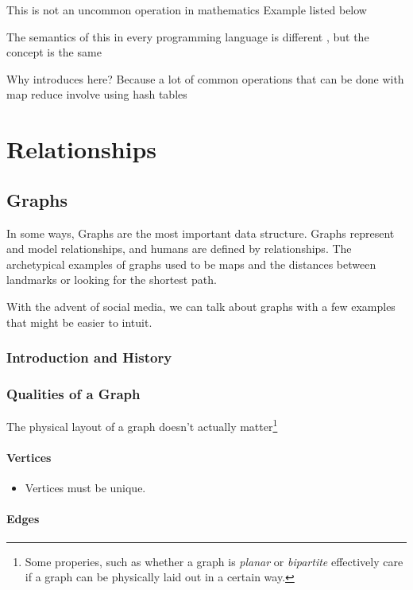 \documentclass[10pt,a4paper]{book}
\begin{document}
This is not an uncommon operation in mathematics Example listed below 



The semantics of this in every programming language is different , but the concept is the same 



Why introduces here? Because a lot of common operations that can be done with map reduce involve using hash tables 


\part{Relationships}

\chapter{Graphs}

In some ways, Graphs are the most important data structure.  
Graphs represent and model relationships, and humans are defined by relationships.
The archetypical examples of graphs used to be maps and the distances between landmarks or looking for the shortest path.

With the advent of social media, we can talk about graphs with a few examples that might be easier to intuit.

\section{Introduction and History}


\section{Qualities of a Graph}

The physical layout of a graph doesn't actually matter\footnote{Some properies, such as whether a graph is \emph{planar} or \emph{bipartite} effectively care if a graph can be physically laid out in a certain way.}

\subsection{Vertices}

\begin{itemize}
	\item Vertices must be unique.
\end{itemize}

\subsection{Edges}
\end{document}
